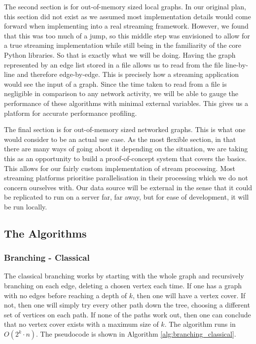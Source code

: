 The second section is for out-of-memory sized local graphs. In our original
plan, this section did not exist as we assumed most implementation details
would come forward when implementing into a real streaming framework. However,
we found that this was too much of a jump, so this middle step was envisioned
to allow for a true streaming implementation while still being in the
familiarity of the core Python libraries. So that is exactly what we will be
doing. Having the graph represented by an edge list stored in a file allows us
to read from the file line-by-line and therefore edge-by-edge. This is
precisely how a streaming application would see the input of a graph. Since the
time taken to read from a file is negligible in comparison to any network
activity, we will be able to gauge the performance of these algorithms with
minimal external variables. This gives us a platform for accurate performance
profiling.

The final section is for out-of-memory sized networked graphs. This is what one
would consider to be an actual use case. As the most flexible section, in that
there are many ways of going about it depending on the situation, we are
taking this as an opportunity to build a proof-of-concept system that covers
the basics. This allows for our fairly custom implementation of stream
processing. Most streaming platforms prioritise parallelisation in their
processing which we do not concern ourselves with. Our data source will be
external in the sense that it could be replicated to run on a server far, far
away, but for ease of development, it will be run locally.

\subsection{The Algorithms}

\subsubsection{Branching - Classical}

The classical branching works by starting with the whole graph and recursively
branching on each edge, deleting a chosen vertex each time. If one has a graph
with no edges before reaching a depth of \(k\), then one will have a vertex
cover. If not, then one will simply try every other path down the tree, choosing a
different set of vertices on each path. If none of the paths work out, then one
can conclude that no vertex cover exists with a maximum size of \(k\). The
algorithm runs in \(O(2^k \cdot n)\). The pseudocode is shown in Algorithm
\ref{alg:branching_classical}.

